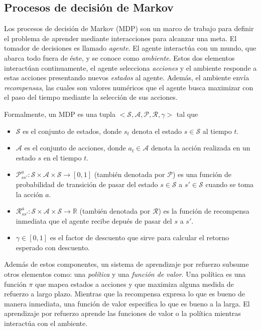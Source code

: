 \subsection{Procesos de decisión de Markov}


Los procesos de decisión de Markov (MDP) son un marco de trabajo para
definir el problema de aprender
mediante interacciones para 
alcanzar una meta. El tomador de 
decisiones es llamado \textit{agente}.
El agente interactúa con un mundo, que
abarca todo fuera de éste, y se
conoce como \textit{ambiente}.
Estos dos elementos
interactúan continuamente, el agente
selecciona \textit{acciones} y
el ambiente responde a estas 
acciones presentando nuevos 
\textit{estados} al agente. Además,
el ambiente envía \textit{recompensas},
las cuales son valores numéricos 
que el agente busca maximizar con
el paso del tiempo mediante la 
selección de sus acciones.

Formalmente, un MDP es una tupla $< \mathcal{S}, \mathcal{A}, \mathcal{P}, \mathcal{R}, \gamma>$ tal que

\begin{itemize}
    \item $\mathcal{S}$ es el conjunto de estados, donde $s_t$ denota el estado $s\in \mathcal{S}$ al tiempo $t$.
    \item $\mathcal{A}$ es el conjunto de acciones, donde $a_t \in \mathcal{A}$
    denota la acción realizada en un estado $s$ en el tiempo $t$.
    \item $\mathcal{P}_{ss'}^{a}: \mathcal{S}\times \mathcal{A} \times \mathcal{S} \rightarrow [0, 1]$ (también denotada por $\mathcal{P}$) es una función de probabilidad de transición de pasar del estado $s \in \mathcal{S}$ a $s' \in \mathcal{S}$ cuando se toma la acción $a$.%
    \item $\mathcal{R}_{ss'}^{a}: \mathcal{S} \times \mathcal{A} \times \mathcal{S} \rightarrow \mathbb{R}$ (también denotada por $\mathcal{R}$) es la función de recompensa inmediata que el agente recibe depués de pasar del $s$ a $s'$.
    \item $\gamma \in [0,1]$ es el factor de descuento que sirve para
    calcular el retorno esperado con descuento.
\end{itemize}


Además de estos componentes, un sistema de aprendizaje por refuerzo subsume otros elementos como: una \textit{política} y una \textit{función de valor}. Una política es una función $\pi$ que mapea estados
a acciones y que maximiza alguna medida de refuerzo a largo plazo. Mientras que la recompensa expresa lo que es bueno
de manera inmediata, una función de valor especifica lo que
es bueno a la larga. 
El aprendizaje por refuerzo aprende las funciones de valor o la política mientras 
interactúa con el ambiente.

